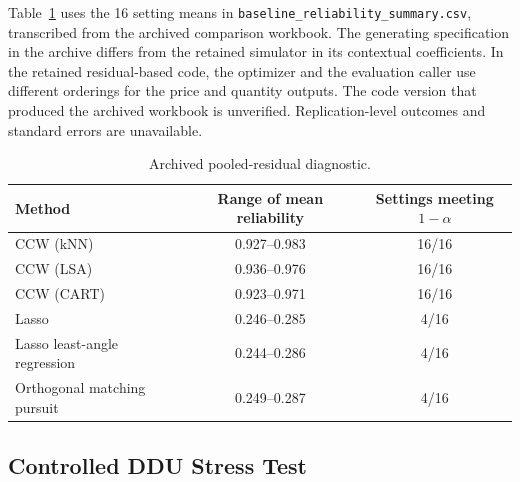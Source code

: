 Table~\ref{tab:baseline-reliability} uses the 16 setting means in \texttt{baseline\_reliability\_summary.csv}, transcribed from the archived comparison workbook. The generating specification in the archive differs from the retained simulator in its contextual coefficients. In the retained residual-based code, the optimizer and the evaluation caller use different orderings for the price and quantity outputs. The code version that produced the archived workbook is unverified. Replication-level outcomes and standard errors are unavailable.

\begin{table}[H]
\centering
\caption{Archived pooled-residual diagnostic.}\label{tab:baseline-reliability}
\begin{tabular}{lcc}
\toprule
Method & Range of mean reliability & Settings meeting \(1-\alpha\)\\
\midrule
CCW (kNN) & 0.927--0.983 & 16/16 \\
CCW (LSA) & 0.936--0.976 & 16/16 \\
CCW (CART) & 0.923--0.971 & 16/16 \\
Lasso & 0.246--0.285 & 4/16 \\
Lasso least-angle regression & 0.244--0.286 & 4/16 \\
Orthogonal matching pursuit & 0.249--0.287 & 4/16 \\
\bottomrule
\end{tabular}
\end{table}

\subsection{Controlled DDU Stress Test}\label{app:stress-design}

